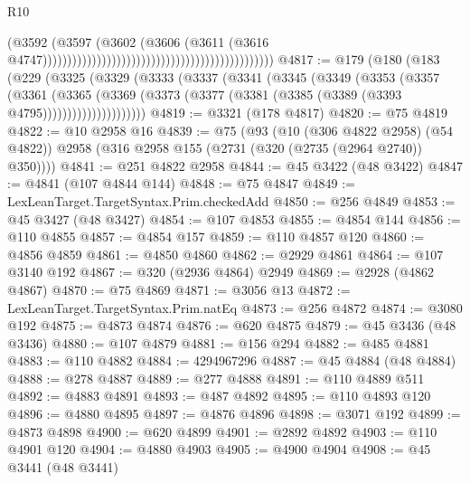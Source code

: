 \begin{lexlean}{R10}
\begin{coremodule}
{{{{{{{{{{{{{{{{{{{{{{{{{{{{{{{{{{{{{{{{{{{{{{{{{{{{{{{{{{{{{{{{{{{{{{{{{{{{{{{{{{{{                                                                                      (@3592
                                                                                        (@3597
                                                                                          (@3602
                                                                                            (@3606
                                                                                              (@3611
                                                                                                (@3616
                                                                                                  @4747)))))))))))))))))))))))))))))))))))))))))))))))
@4817 := @179
    (@180
      (@183
        (@229
          (@3325
            (@3329
              (@3333
                (@3337
                  (@3341
                    (@3345
                      (@3349
                        (@3353
                          (@3357
                            (@3361
                              (@3365
                                (@3369
                                  (@3373
                                    (@3377 (@3381 (@3385 (@3389 (@3393 @4795)))))))))))))))))))))
@4819 := @3321 (@178 @4817)
@4820 := @75 @4819
@4822 := @10 @2958 @16
@4839 := @75
    (@93
      (@10 (@306 @4822 @2958) (@54 @4822))
      @2958
      (@316 @2958 @155 (@2731 (@320 (@2735 (@2964 @2740)) @350))))
@4841 := @251 @4822 @2958
@4844 := @45 @3422 (@48 @3422)
@4847 := @4841 (@107 @4844 @144)
@4848 := @75 @4847
@4849 := LexLeanTarget.TargetSyntax.Prim.checkedAdd
@4850 := @256 @4849
@4853 := @45 @3427 (@48 @3427)
@4854 := @107 @4853
@4855 := @4854 @144
@4856 := @110 @4855
@4857 := @4854 @157
@4859 := @110 @4857 @120
@4860 := @4856 @4859
@4861 := @4850 @4860
@4862 := @2929 @4861
@4864 := @107 @3140 @192
@4867 := @320 (@2936 @4864) @2949
@4869 := @2928 (@4862 @4867)
@4870 := @75 @4869
@4871 := @3056 @13
@4872 := LexLeanTarget.TargetSyntax.Prim.natEq
@4873 := @256 @4872
@4874 := @3080 @192
@4875 := @4873 @4874
@4876 := @620 @4875
@4879 := @45 @3436 (@48 @3436)
@4880 := @107 @4879
@4881 := @156 @294
@4882 := @485 @4881
@4883 := @110 @4882
@4884 := 4294967296
@4887 := @45 @4884 (@48 @4884)
@4888 := @278 @4887
@4889 := @277 @4888
@4891 := @110 @4889 @511
@4892 := @4883 @4891
@4893 := @487 @4892
@4895 := @110 @4893 @120
@4896 := @4880 @4895
@4897 := @4876 @4896
@4898 := @3071 @192
@4899 := @4873 @4898
@4900 := @620 @4899
@4901 := @2892 @4892
@4903 := @110 @4901 @120
@4904 := @4880 @4903
@4905 := @4900 @4904
@4908 := @45 @3441 (@48 @3441)
}}}}}}}}}}}}}}}}}}}}}}}}}}}}}}}}}}}}}}}}}}}}}}}}}}}}}}}}}}}}}}}}}}}}}}}}}}}}}}}}}}}}
\end{coremodule}
\end{lexlean}
